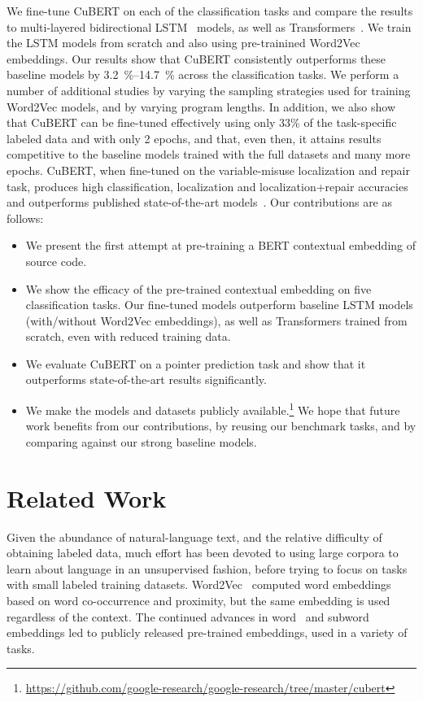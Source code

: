 \documentclass{article}
\newcommand{\BERTforCode}{CuBERT\xspace}
\newcommand{\update}[1]{#1}
\begin{document}
We fine-tune \BERTforCode on each of the {classification} tasks and compare the results to multi-layered bidirectional LSTM~\citep{Hochreiter:1997:LSM:1246443.1246450} models, as well as Transformers~\citep{NIPS2017_7181}. We train the LSTM models from scratch and also using pre-trainined Word2Vec embeddings. Our results show that \BERTforCode consistently outperforms these baseline models by \update{\SIrange{3.2}{14.7}{\percent}} across the classification tasks. We perform a number of additional studies by varying the sampling strategies used for training Word2Vec models, and by varying program lengths. In addition, we also show that \BERTforCode can be fine-tuned effectively using only 33\% of the task-specific labeled data and with only 2 epochs, and that, even then, it attains results competitive to the baseline models trained with the full datasets and many more epochs. \BERTforCode, when fine-tuned on the variable-misuse localization and repair task, produces high classification, localization and localization+repair accuracies and outperforms published state-of-the-art models~\cite{hellendoorn2020global,DBLP:journals/corr/abs-1904-01720}.
Our contributions are as follows:
\begin{itemize}
    \item We present the first attempt at pre-training a BERT contextual embedding of source code.
    \item We show the efficacy of the pre-trained contextual embedding on five classification tasks. Our fine-tuned models outperform baseline LSTM models (with/without Word2Vec embeddings), as well as Transformers trained from scratch, even with reduced training data.
    \item We evaluate \BERTforCode on a pointer prediction task and show that it outperforms state-of-the-art results significantly.
    \item We make the models and datasets publicly available.\footnote{\url{https://github.com/google-research/google-research/tree/master/cubert}} We hope that future work benefits from our contributions, by reusing our benchmark tasks, and by comparing against our strong baseline models.
\end{itemize}


\section{Related Work}
\label{sec:related}

Given the abundance of natural-language text, and the relative difficulty of obtaining labeled data, much effort has been devoted to using large corpora to learn about language in an unsupervised fashion, before trying to focus on tasks with small labeled training datasets. Word2Vec~\citep{DBLP:journals/corr/abs-1301-3781,NIPS2013_5021} computed word embeddings based on word co-occurrence and proximity, but the same embedding is used regardless of the context. The continued advances in word~\citep{Pennington14glove:global} and subword~\citep{bojanowski2017enriching} embeddings led to publicly released pre-trained embeddings, used in a variety of tasks.
\end{document}
